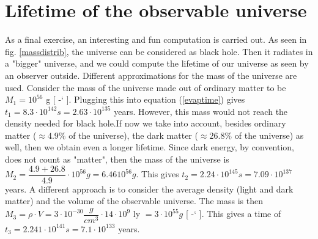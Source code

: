 \documentclass[%
 aip,
 jmp,%
 amsmath,amssymb,
 reprint,%
]{revtex4-1}
\newcommand*{\citen}[1]{%
  \begingroup
    \romannumeral-`\x %
    \setcitestyle{numbers}%
    \cite{#1}%
  \endgroup   
}
\begin{document}
\section{Lifetime of the observable universe}

As a final exercise, an interesting and fun computation is carried out. As seen in fig. \ref{massdistrib}, the universe can be considered as black hole. Then it radiates in a "bigger" universe, and we could compute the lifetime of our universe as seen by an observer outside. Different approximations for the mass of the universe are used. Consider the mass of the universe made out of ordinary matter to be $M_1 = 10^{56}$ g [\citen{massuniverse}]. Plugging this into equation (\ref{evaptime}) gives $t_1 = 8.3 \cdot 10^{142} s = 2.63 \cdot 10^{135}$ years. However, this mass would not reach the density needed for black hole.If now we take into account, besides ordinary matter ($\approx 4.9 \%$ of the universe), the dark matter ($\approx 26.8 \%$ of the universe) as well, then we obtain even a longer lifetime. Since dark energy, by convention, does not count as "matter", then the mass of the universe is $ M_2 = \dfrac{4.9 + 26.8}{4.9} \cdot 10^{56} g = 6.46 10^{56} g$. This gives $t_2 = 2.24 \cdot 10^{145} s = 7.09 \cdot 10^{137}$ years. A different approach is to consider the average density (light and dark matter) and the volume of the observable universe. The mass is then $M_3 = \rho \cdot V = 3 \cdot 10^{-30} \dfrac{g}{cm^3} \cdot 14 \cdot 10^9$ ly  $= 3 \cdot 10^{55} g$ [\citen{massuniverse3}]. This gives a time of $t_3 = 2.241 \cdot 10^{141} s = 7.1 \cdot 10^{133}$ years.


 
\end{document}
